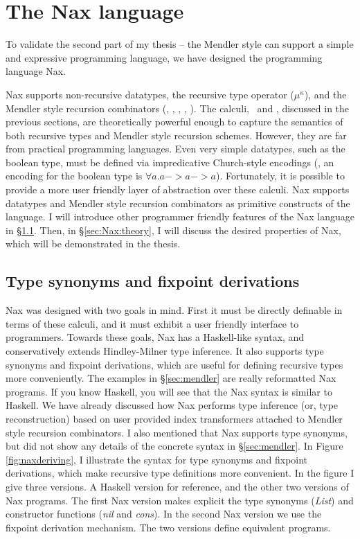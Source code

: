 \section{The Nax language}\label{sec:Nax}

To validate the second part of my thesis -- the Mendler style can support 
a simple and expressive programming language, we have designed the
programming language Nax.

Nax supports non-recursive datatypes, the recursive type operator
($\mu^\kappa$), and the Mendler style recursion combinators (\MIt, \MPr,
\McvIt, \McvPr, \MsfIt). The calculi, \Fi\ and \Fixi, discussed
in the previous sections, are theoretically powerful enough to capture
the semantics of both recursive types and Mendler style recursion schemes.
However, they are far from practical programming languages. Even very simple
datatypes, such as the boolean type, must be defined via impredicative 
Church-style encodings (\eg, an encoding for the boolean type is
$\forall a . a -> a -> a$). Fortunately, it is possible to provide
a more user friendly layer of abstraction over these calculi. Nax supports
datatypes and Mendler style recursion combinators as primitive constructs of
the language. I will introduce other programmer friendly features of
the Nax language in \S\ref{sec:Nax:tysym}. Then, in \S\ref{sec:Nax:theory},
I will discuss the desired properties of Nax, which will be demonstrated
in the thesis.

\subsection{Type synonyms and fixpoint derivations}\label{sec:Nax:tysym}

Nax was designed with two goals in mind. First it must be directly definable
in terms of these calculi, and it must exhibit a user friendly interface to
programmers. Towards these goals, Nax has a Haskell-like syntax, and
conservatively extends Hindley-Milner type inference. It also supports
type synonyms and fixpoint derivations, which are useful for defining
recursive types more conveniently. The examples in \S\ref{sec:mendler} are
really reformatted Nax programs. If you know Haskell, you will see that
the Nax syntax is similar to Haskell. We have already discussed how Nax
performs type inference (or, type reconstruction) based on user provided
index transformers attached to Mendler style recursion combinators. I also
mentioned that Nax supports type synonyms, but did not show any details of
the concrete syntax in \S\ref{sec:mendler}. In Figure \ref{fig:naxderiving},
I illustrate the syntax for type synonyms and fixpoint derivations, which make
recursive type definitions more convenient. In the figure I give three versions.
A Haskell version for reference, and the other two versions of Nax programs.
The first Nax version makes explicit the type synonyms (\textit{List})
and constructor functions (\textit{nil} and \textit{cons}).
In the second Nax version we use the fixpoint derivation mechanism.
The two versions define equivalent programs.

